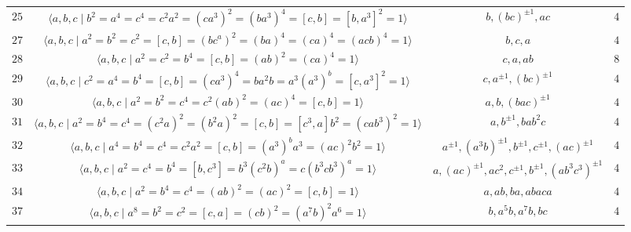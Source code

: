 \documentclass{amsart}
\begin{document}
{\begin{table}
\begin{tabular}{|c|c|c|c|}
			$25$&$\langle a,b,c\mid b^2=a^4=c^4=c^2a^2=(ca^{3})^2=(ba^{3})^4=[c,b]=[b,a^{3}]^2=1\rangle$& $ b, (bc)^{\pm 1}, ac$&$4$\\				
			$27$&$\langle a,b,c\mid a^2=b^2=c^2=[c,b]=(bc^a)^2=(ba)^4=(ca)^4=(acb)^4=1\rangle$& $ b, c, a$&$4$\\		
			$28$&$\langle a,b,c\mid a^2=c^2=b^4=[c,b]=(ab)^2=(ca)^4=1\rangle$&$ c, a, ab $&$8$\\		
			$29$&$\langle a,b,c\mid  c^2=a^4=b^4=[c,b]=(ca^{3})^4=ba^2b=a^{3}(a^{3})^b=[c,a^{3}]^2=1\rangle$& $c, a^{\pm 1}, (bc)^{\pm 1}$&$4$\\		
			$30$&$\langle a,b,c\mid  a^2=b^2=c^4=c^2(ab)^2=(ac)^4=[c,b]=1\rangle$&$ a, b, (bac)^{\pm 1}$&$4$\\		
			$31$&$\langle a,b,c\mid a^2=b^4=c^4=(c^{2}a)^2=(b^{2}a)^2=[c,b]=[c^{3},a]b^{2}=(cab^3)^2=1\rangle$& $a, b^{\pm 1}, bab^2c$&$4$\\
			$32$&$\langle a,b,c\mid a^4=b^4=c^4=c^2a^2=[c,b]=(a^{3})^ba^{3}=(ac)^2b^2=1\rangle$& $ a^{\pm 1}, (a^3b)^{\pm 1}, b^{\pm 1}, c^{\pm 1}, (ac)^{\pm 1} $&$4$\\
			$33$& $\langle a,b,c\mid a^2=c^4=b^4=[b,c^{3}]=b^{3}(c^2b)^a=c(b^{3}cb^{3})^a=1\rangle$&$a, (ac)^{\pm 1}, ac^2, c^{\pm 1}, b^{\pm 1}, (ab^3c^3)^{\pm 1}$	&$4$\\
			$34$& $\langle a,b,c\mid a^2=b^4=c^4=(ab)^2=(ac)^2=[c,b]=1\rangle$& $a, ab, ba, abaca$&$4$\\
			$37$&$\langle a,b,c\mid a^8=b^2=c^2=[c,a]=(cb)^2=(a^7b)^2a^6=1\rangle$ & $b, a^5b, a^7b, bc $&$4$\\

\end{tabular}
\end{table}}
\end{document}
